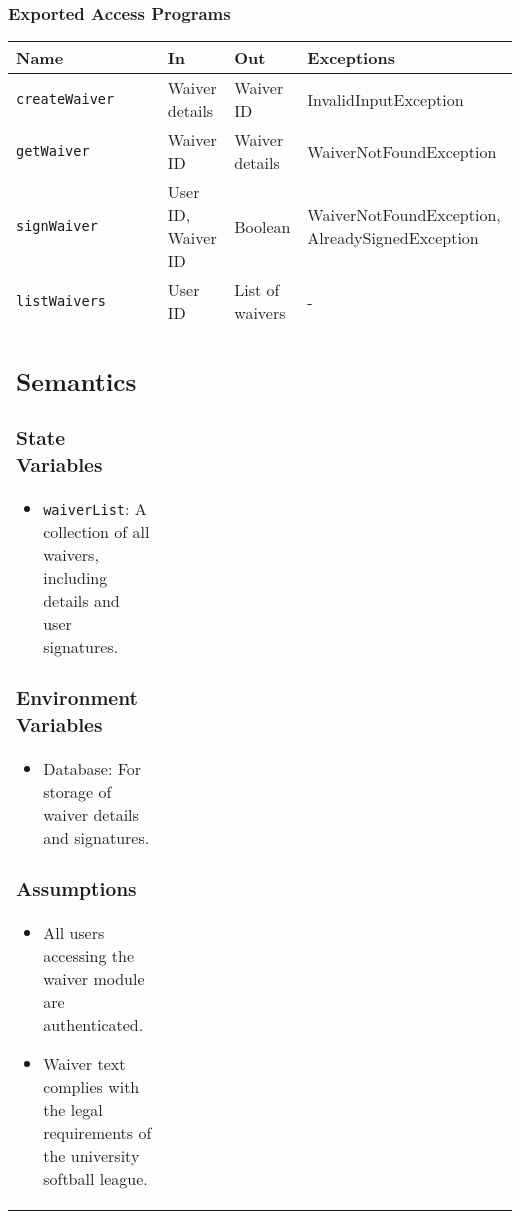 \documentclass[12pt, titlepage]{article}
\begin{document}
\subsubsection{Exported Access Programs}
\begin{center}
\begin{tabular}{|p{3cm}|p{4cm}|p{4cm}|p{4cm}|}
\hline
\textbf{Name} & \textbf{In} & \textbf{Out} & \textbf{Exceptions} \\
\hline
\texttt{createWaiver} & Waiver details & Waiver ID & InvalidInputException \\
\texttt{getWaiver} & Waiver ID & Waiver details & WaiverNotFoundException \\
\texttt{signWaiver} & User ID, Waiver ID & Boolean & WaiverNotFoundException, AlreadySignedException \\
\texttt{listWaivers} & User ID & List of waivers & - \\

\subsection{Semantics}

\subsubsection{State Variables}

\begin{itemize}
    \item \texttt{waiverList}: A collection of all waivers, including details and user signatures.
\end{itemize}

\subsubsection{Environment Variables}
\begin{itemize}
    \item Database: For storage of waiver details and signatures.
\end{itemize}

\subsubsection{Assumptions}
\begin{itemize}
    \item All users accessing the waiver module are authenticated.
    \item Waiver text complies with the legal requirements of the university softball league.
    

\end{itemize}
\end{tabular}
\end{center}
\end{document}
